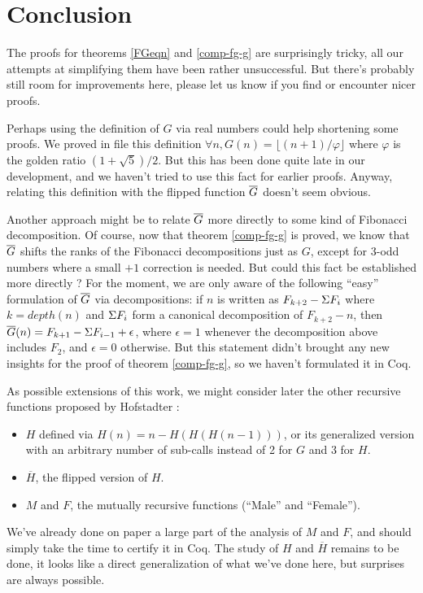 \documentclass[a4paper,11pt]{article}
\begin{document}
\section{Conclusion}

The proofs for theorems \ref{FGeqn} and \ref{comp-fg-g} are
surprisingly tricky, all our attempts at simplifying them
have been rather unsuccessful. But there's probably still room
for improvements here, please let us know if you find or
encounter nicer proofs.

Perhaps using the definition of $G$
via real numbers could help shortening some proofs.
We proved in file  this definition
$\forall n, G(n)=\lfloor (n+1)/\varphi\rfloor$ where $\varphi$
is the golden ratio $(1+\sqrt{5})/2$. But this has been done
quite late in our development, and we haven't tried to use this
fact for earlier proofs. Anyway,
relating this definition with the flipped function $\overline{G}$
doesn't seem obvious.

Another approach might be to relate
$\overline{G}$ more directly to some kind of Fibonacci decomposition.
Of course, now that theorem \ref{comp-fg-g} is proved, we
know that $\overline{G}$ shifts the ranks of the Fibonacci decompositions
just as $G$, except for 3-odd numbers where a small $+1$
correction is needed. But could this fact be established more
directly ? For the moment, we are only aware of the following
``easy'' formulation of $\overline{G}$ via decompositions:
if $n$ is written as $F_{k+2}-\Sigma F_i$ where $k=depth(n)$
and $\Sigma F_i$ form a canonical decomposition of $F_{k+2}-n$, then
$\overline{G}(n)=F_{k+1}-\Sigma F_{i-1}+\epsilon$, where $\epsilon=1$ whenever
the decomposition above includes $F_2$, and $\epsilon=0$
otherwise. But this statement didn't brought any new insights
for the proof of theorem \ref{comp-fg-g}, so we haven't formulated
it in Coq.

As possible extensions of this work, we might consider later
the other recursive functions proposed by Hofstadter :
\begin{itemize}
\item $H$ defined via $H(n)=n-H(H(H(n-1)))$, or its generalized
   version with an arbitrary number of sub-calls instead of 2
   for $G$ and 3 for $H$.
\item $\overline{H}$, the flipped version of $H$.
\item $M$ and $F$, the mutually recursive functions (``Male''
and ``Female'').
\end{itemize}
We've already done on paper a large part of the analysis of
$M$ and $F$, and should simply take the time to certify
it in Coq. The study of $H$ and $\overline{H}$ remains to be
done, it looks like a direct generalization of what we've
done here, but surprises are always possible.
\end{document}
